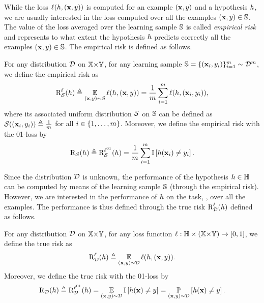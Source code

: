 While the loss $\loss(\h, (\x,\y))$ is computed for an example $(\x,\y)$ and a hypothesis $\h$, we are usually interested in the loss computed over all the examples $(\x,\y)\in\S$.
The value of the loss averaged over the learning sample $\S$ is called {\it empirical risk} and represents to what extent the hypothesis $\h$ predicts correctly all the examples $(\x,\y)\in\S$.
The empirical risk is defined as follows.

\begin{definition}
For any distribution $\D$ on $\X{\times}\Y$, for any learning sample $\S=\{(\x_i, \y_i)\}_{i=1}^{\m}\sim\D^{\m}$, we define the empirical risk as
\begin{align*}
    \RiskLoss_{\dS}(\h) \defeq \EE_{(\x,\y)\sim\dS}\loss(\h, (\x,\y)) = \frac{1}{\m}\sum_{i=1}^{\m}\loss(\h, (\x_i,\y_i)),
\end{align*}
where its associated uniform distribution $\dS$ on $\S$ can be defined as $\dS((\x_i,\y_i))\defeq\frac{1}{\m}$ for all $i\in\{1,\dots, \m\}$.
Moreover, we define the empirical risk with the 01-loss by
\begin{align*}
    \Risk_{\dS}(\h) \defeq \RiskLossZO_{\dS}(\h) = \frac{1}{\m}\sum_{i=1}^{\m}\indic\LB \h(\x_i) \ne \y_i\RB.
\end{align*}
\end{definition}

Since the distribution $\D$ is unknown, the performance of the hypothesis $\h\in\H$ can be computed by means of the learning sample $\S$ (through the empirical risk).
However, we are interested in the performance of $\h$ on the task, \ie, over all the examples.
The performance is thus defined through the true risk $\RiskLoss_{\D}(\h)$ defined as follows.

\begin{definition}
For any distribution $\D$ on $\X{\times}\Y$, for any loss function $\loss: \H\times (\X{\times}\Y) \to [0, 1]$, we define the true risk as
\begin{align*}
    \RiskLoss_{\D}(\h) \defeq \EE_{(\x,\y)\sim\D}\loss(\h, (\x,\y)).
\end{align*}
Moreover, we define the true risk with the 01-loss by
\begin{align*}
    \Risk_{\D}(\h) \defeq \RiskLossZO_{\D}(\h) = \EE_{(\x,\y)\sim\D}\indic\LB\h(\x) \ne \y\RB = \PP_{(\x,\y)\sim\D}\LB \h(\x) \ne \y\RB.
\end{align*}
\end{definition}

